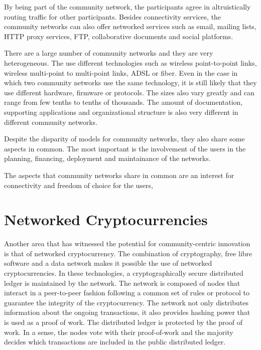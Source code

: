 \documentclass[journal]{IEEEtran}
\begin{document}
By being part of the community network, the participants agree in altruistically routing traffic for other participants.
Besides connectivity services, the community networks can also offer networked services such as email, mailing lists, HTTP proxy services, FTP, collaborative documents and social platforms.

There are a large number of community networks and they are very heterogeneous.
The use different technologies such as wireless point-to-point links, wireless multi-point to multi-point links, ADSL or fiber.
Even in the case in which two community networks use the same technology, it is still likely that they use different hardware, firmware or protocols.
The sizes also vary greatly and can range from few tenths to tenths of thousands.
The amount of documentation, supporting applications and organizational structure is also very different in different community networks.

Despite the disparity of models for community networks, they also share some aspects in common.
The most important is the involvement of the users in the planning, financing, deployment and maintainance of the networks.

The aspects that community networks share in common are an interest for connectivity and freedom of choice for the users, 

\section{Networked Cryptocurrencies}

Another area that has witnessed the potential for community-centric innovation is that of networked cryptocurrency.
The combination of cryptography, free libre software and a data network makes it possible the use of networked cryptocurrencies.
In these technologies, a cryptographically secure distributed ledger is maintained by the network.
The network is composed of nodes that interact in a peer-to-peer fashion following a common set of rules or protocol to guarantee the integrity of the cryptocurrency.
The network not only distributes information about the ongoing transactions, it also provides hashing power that is used as a proof of work.
The distributed ledger is protected by the proof of work.
In a sense, the nodes vote with their proof-of-work and the majority decides which transactions are included in the public distributed ledger.
\end{document}

